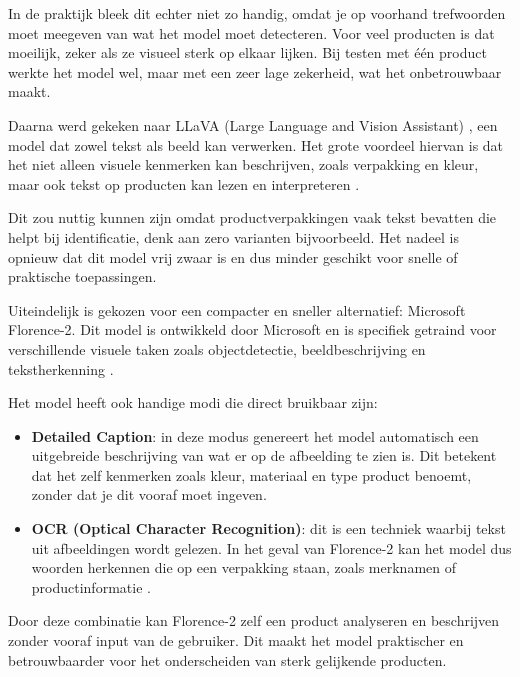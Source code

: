 In de praktijk bleek dit echter niet zo handig, omdat je op voorhand trefwoorden moet meegeven van wat het model moet detecteren. Voor veel producten is dat moeilijk, zeker als ze visueel sterk op elkaar lijken. Bij testen met één product werkte het model wel, maar met een zeer lage zekerheid, wat het onbetrouwbaar maakt.

Daarna werd gekeken naar LLaVA (Large Language and Vision Assistant) \autocite{liu2023improvedllava, liu2023llava}, een model dat zowel tekst als beeld kan verwerken. Het grote voordeel hiervan is dat het niet alleen visuele kenmerken kan beschrijven, zoals verpakking en kleur, maar ook tekst op producten kan lezen en interpreteren \autocite{liu2023visualinstructiontuning}.  

Dit zou nuttig kunnen zijn omdat productverpakkingen vaak tekst bevatten die helpt bij identificatie, denk aan zero varianten bijvoorbeeld. Het nadeel is opnieuw dat dit model vrij zwaar is en dus minder geschikt voor snelle of praktische toepassingen.

Uiteindelijk is gekozen voor een compacter en sneller alternatief: Microsoft Florence-2. Dit model is ontwikkeld door Microsoft en is specifiek getraind voor verschillende visuele taken zoals objectdetectie, beeldbeschrijving en tekstherkenning \autocite{xiao2023florence2advancingunifiedrepresentation}.  

Het model heeft ook handige modi die direct bruikbaar zijn:

\begin{itemize}
    \item \textbf{Detailed Caption}: in deze modus genereert het model automatisch een uitgebreide beschrijving van wat er op de afbeelding te zien is. Dit betekent dat het zelf kenmerken zoals kleur, materiaal en type product benoemt, zonder dat je dit vooraf moet ingeven.
    
    \item \textbf{OCR (Optical Character Recognition)}: dit is een techniek waarbij tekst uit afbeeldingen wordt gelezen. In het geval van Florence-2 kan het model dus woorden herkennen die op een verpakking staan, zoals merknamen of productinformatie \autocite{ocribm}.  
\end{itemize}

Door deze combinatie kan Florence-2 zelf een product analyseren en beschrijven zonder vooraf input van de gebruiker. Dit maakt het model praktischer en betrouwbaarder voor het onderscheiden van sterk gelijkende producten.

